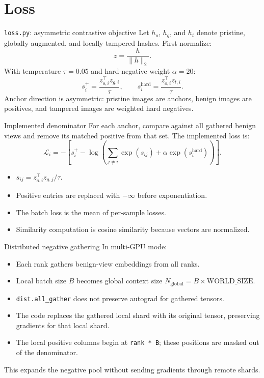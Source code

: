 \documentclass[aspectratio=169,10pt]{beamer}
\newcommand{\file}[1]{\texttt{#1}}
\newcommand{\code}[1]{\texttt{#1}}
\begin{document}
\section{Loss}

\begin{frame}{\file{loss.py}: asymmetric contrastive objective}
  Let $h_o$, $h_g$, and $h_t$ denote pristine, globally augmented, and locally
  tampered hashes. First normalize:
  \[
    z = \frac{h}{\lVert h\rVert_2}.
  \]
  With temperature $\tau=0.05$ and hard-negative weight $\alpha=20$:
  \[
    s_i^+ = \frac{z_{o,i}^\top z_{g,i}}{\tau},
    \qquad
    s_i^{\mathrm{hard}} = \frac{z_{o,i}^\top z_{t,i}}{\tau}.
  \]
  Anchor direction is asymmetric: pristine images are anchors, benign images
  are positives, and tampered images are weighted hard negatives.
\end{frame}

\begin{frame}{Implemented denominator}
  For each anchor, compare against all gathered benign views and remove its
  matched positive from that set. The implemented loss is:
  \[
    \mathcal{L}_i =
    -\left[
      s_i^+ -
      \log\left(
        \sum_{j\ne i}\exp(s_{ij}) +
        \alpha\exp(s_i^{\mathrm{hard}})
      \right)
    \right].
  \]
  \begin{itemize}
    \item $s_{ij}=z_{o,i}^\top z_{g,j}/\tau$.
    \item Positive entries are replaced with $-\infty$ before exponentiation.
    \item The batch loss is the mean of per-sample losses.
    \item Similarity computation is cosine similarity because vectors are normalized.
  \end{itemize}
\end{frame}

\begin{frame}{Distributed negative gathering}
  In multi-GPU mode:
  \begin{itemize}
    \item Each rank gathers benign-view embeddings from all ranks.
    \item Local batch size $B$ becomes global context size
          $N_{\mathrm{global}}=B\times\mathrm{WORLD\_SIZE}$.
    \item \code{dist.all\_gather} does not preserve autograd for gathered tensors.
    \item The code replaces the gathered local shard with its original tensor,
          preserving gradients for that local shard.
    \item The local positive columns begin at \code{rank * B}; these positions
          are masked out of the denominator.
  \end{itemize}
  This expands the negative pool without sending gradients through remote shards.
\end{frame}
\end{document}
